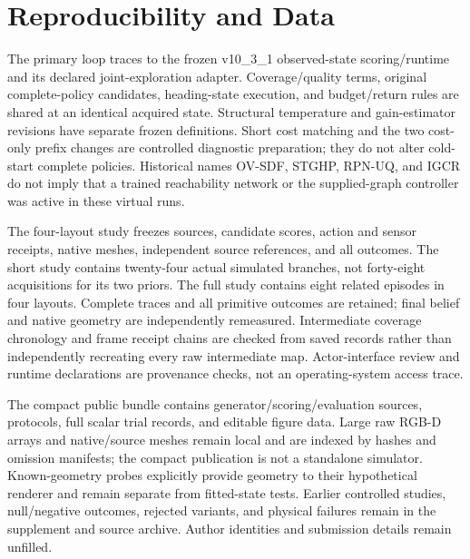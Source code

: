 \section{Reproducibility and Data}\label{reproducibility-and-data}
The primary loop traces to the frozen v10\_3\_1 observed-state scoring/runtime and its declared joint-exploration adapter. Coverage/quality terms, original complete-policy candidates, heading-state execution, and budget/return rules are shared at an identical acquired state. Structural temperature and gain-estimator revisions have separate frozen definitions. Short cost matching and the two cost-only prefix changes are controlled diagnostic preparation; they do not alter cold-start complete policies. Historical names OV-SDF, STGHP, RPN-UQ, and IGCR do not imply that a trained reachability network or the supplied-graph controller was active in these virtual runs.

The four-layout study freezes sources, candidate scores, action and sensor receipts, native meshes, independent source references, and all outcomes. The short study contains twenty-four actual simulated branches, not forty-eight acquisitions for its two priors. The full study contains eight related episodes in four layouts. Complete traces and all primitive outcomes are retained; final belief and native geometry are independently remeasured. Intermediate coverage chronology and frame receipt chains are checked from saved records rather than independently recreating every raw intermediate map. Actor-interface review and runtime declarations are provenance checks, not an operating-system access trace.

The compact public bundle contains generator/scoring/evaluation sources, protocols, full scalar trial records, and editable figure data. Large raw RGB-D arrays and native/source meshes remain local and are indexed by hashes and omission manifests; the compact publication is not a standalone simulator. Known-geometry probes explicitly provide geometry to their hypothetical renderer and remain separate from fitted-state tests. Earlier controlled studies, null/negative outcomes, rejected variants, and physical failures remain in the supplement and source archive. Author identities and submission details remain unfilled.
